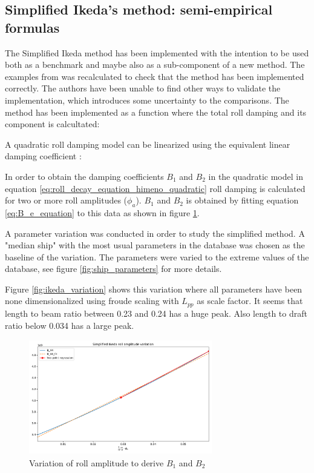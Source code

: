 \subsection{Simplified Ikeda's method: semi-empirical formulas}
\label{se:simplified_ikeda}
The Simplified Ikeda method \cite{kawahara_simple_2011} has been implemented \cite{alexandersson_martinlarsalbertrolldecay-estimators_2020} with the intention to be used both as a benchmark and maybe also as a sub-component of a new method. The examples from \cite{kawahara_simple_2011} was recalculated to check that the method has been implemented correctly. The authors have been unable to find other ways to validate the implementation, which introduces some uncertainty to the comparisons. The method has been implemented as a function where the total roll damping and its component is calcultated: 


A quadratic roll damping model can be linearized using the equivalent linear damping coefficient \cite{himeno_prediction_1981}:

In order to obtain the damping coefficients $B_1$ and $B_2$ in the quadratic model in equation \ref{eq:roll_decay_equation_himeno_quadratic} roll damping is calculated for two or more roll amplitudes ($\phi_a$). $B_1$ and $B_2$ is obtained by fitting equation \ref{eq:B_e_equation} to this data as shown in figure \ref{fig:ikeda_B_1_B2}.  

A parameter variation was conducted in order to study the simplified method.
A "median ship" with the most usual parameters in the database was chosen as the baseline of the variation. The parameters were varied to the extreme values of the database, see figure \ref{fig:ship_parameters} for more details. 

Figure \ref{fig:ikeda_variation} shows this variation where all parameters have been none dimensionalized using froude scaling with $L_{pp}$ as scale factor. 
It seems that length to beam ratio between 0.23 and 0.24 has a huge peak. Also length to draft ratio below 0.034 has a large peak. 

\begin{figure}[H]
    \centering
    \includegraphics[height=5cm, width=8cm]{figures/ikeda_B_1_B_2.pdf}
    \vspace{-0.5cm}
    \caption{Variation of roll amplitude to derive $B_1$ and $B_2$}
    \label{fig:ikeda_B_1_B2}
\end{figure}

